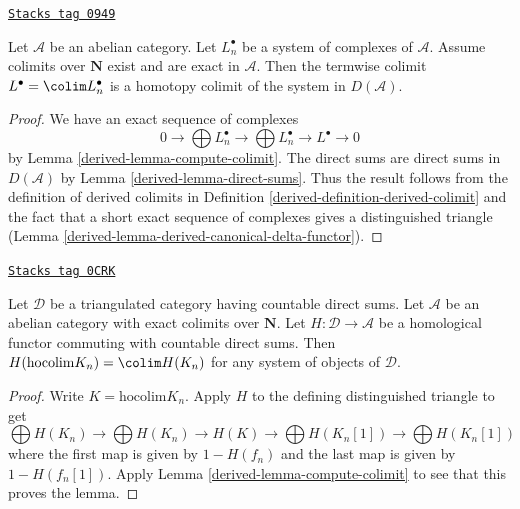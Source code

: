 \begin{lemma}
\label{derived-lemma-colim-hocolim}
\href{https://stacks.math.columbia.edu/tag/0949}{\texttt{Stacks tag 0949}}

Let $\mathcal{A}$ be an abelian category. Let $L_n^\bullet$
be a system of complexes of $\mathcal{A}$. Assume
colimits over $\mathbf{N}$ exist and are exact in $\mathcal{A}$.
Then the termwise
colimit $L^\bullet = \colim L_n^\bullet$ is a homotopy colimit of the
system in $D(\mathcal{A})$.
\end{lemma}

\begin{proof}

We have an exact sequence of complexes
$$
0 \to \bigoplus L_n^\bullet \to \bigoplus L_n^\bullet \to L^\bullet \to 0
$$
by Lemma \ref{derived-lemma-compute-colimit}.
The direct sums are direct sums in $D(\mathcal{A})$ by
Lemma \ref{derived-lemma-direct-sums}.
Thus the result follows from the definition
of derived colimits in
Definition \ref{derived-definition-derived-colimit}
and the fact that a short exact sequence of complexes
gives a distinguished triangle
(Lemma \ref{derived-lemma-derived-canonical-delta-functor}).
\end{proof}

\begin{lemma}
\label{derived-lemma-cohomology-of-hocolim}
\href{https://stacks.math.columbia.edu/tag/0CRK}{\texttt{Stacks tag 0CRK}}

Let $\mathcal{D}$ be a triangulated category having countable
direct sums. Let $\mathcal{A}$ be an abelian category with exact
colimits over $\mathbf{N}$.
Let $H : \mathcal{D} \to \mathcal{A}$ be a homological functor
commuting with countable direct sums.
Then $H(\text{hocolim} K_n) = \colim H(K_n)$
for any system of objects of $\mathcal{D}$.
\end{lemma}

\begin{proof}

Write $K = \text{hocolim} K_n$. Apply $H$ to the defining
distinguished triangle to get
$$
\bigoplus H(K_n) \to \bigoplus H(K_n)
\to H(K) \to
\bigoplus H(K_n[1]) \to \bigoplus H(K_n[1])
$$
where the first map is given by $1 - H(f_n)$ and the last map
is given by $1 - H(f_n[1])$.
Apply Lemma \ref{derived-lemma-compute-colimit} to see that this proves the lemma.
\end{proof}


